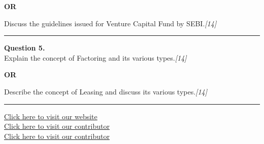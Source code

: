 \documentclass[11pt,a4paper]{article}
\newcommand{\pts}[1]{\hfill   \textit{[#1]}}
\begin{document}
\centerline{   \textbf{OR}}

Discuss the guidelines issued for Venture Capital Fund by SEBI.\pts{14}

\medskip\rule{\linewidth}{0.2pt}




\noindent   \textbf{Question 5.} \\
Explain the concept of Factoring and its various types.\pts{14}

\centerline{   \textbf{OR}}

Describe the concept of Leasing and discuss its various types.\pts{14}

\vfill
\rule{\linewidth}{0.4pt}

\begin{center}\small
  \href{https://bhu-exam.vercel.app/}{Click here to visit our website}\\[4pt]
  \href{https://me-aryan.vercel.app/}{Click here to visit our contributor}\\[4pt]
  \href{https://quashan-me.vercel.app/}{Click here to visit our contributor}
\end{center}
\end{document}
